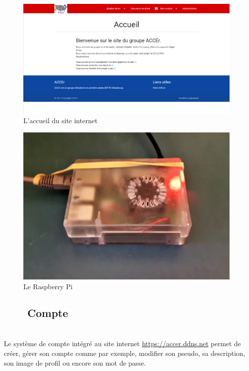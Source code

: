 \documentclass[titlepage, 13px, a4paper]{report}
\begin{document}
\begin{figure}[h!]
  \centering
  \includegraphics[scale=0.25]{images/website_accueil.png}
  \caption{L'accueil du site internet}
\end{figure}
\begin{figure}[h!]
  \centering
  \includegraphics[scale=0.06]{images/website_rpi.jpg}
  \caption{Le Raspberry Pi}
\end{figure}

\newpage

\subsection[Compte]{~~~~Compte}
\paragraph*{} \hspace{0pt} \\
Le système de compte intégré au site internet \url{https://accer.ddns.net} permet de créer, 
gérer son compte comme par exemple, modifier son pseudo, sa description, son image de profil 
ou encore son mot de passe. \\
\end{document}
